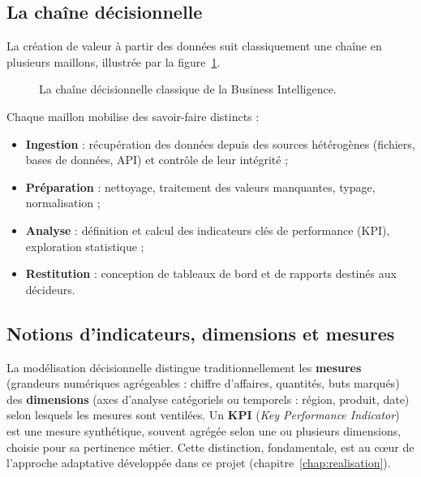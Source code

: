 \subsection{La chaîne décisionnelle}
La création de valeur à partir des données suit classiquement une chaîne en
plusieurs maillons, illustrée par la figure~\ref{fig:chaine}.

\begin{figure}[ht]
\centering
{}
\caption{La chaîne décisionnelle classique de la Business Intelligence.}
\label{fig:chaine}
\end{figure}

Chaque maillon mobilise des savoir-faire distincts :
\begin{itemize}
  \item \textbf{Ingestion} : récupération des données depuis des sources
        hétérogènes (fichiers, bases de données, API) et contrôle de leur
        intégrité ;
  \item \textbf{Préparation} : nettoyage, traitement des valeurs manquantes,
        typage, normalisation ;
  \item \textbf{Analyse} : définition et calcul des indicateurs clés de
        performance (KPI), exploration statistique ;
  \item \textbf{Restitution} : conception de tableaux de bord et de rapports
        destinés aux décideurs.
\end{itemize}

\subsection{Notions d'indicateurs, dimensions et mesures}
La modélisation décisionnelle distingue traditionnellement les
\textbf{mesures} (grandeurs numériques agrégeables : chiffre d'affaires,
quantités, buts marqués) des \textbf{dimensions} (axes d'analyse catégoriels
ou temporels : région, produit, date) selon lesquels les mesures sont
ventilées. Un \textbf{KPI} (\textit{Key Performance Indicator}) est une
mesure synthétique, souvent agrégée selon une ou plusieurs dimensions,
choisie pour sa pertinence métier. Cette distinction, fondamentale, est au
cœur de l'approche adaptative développée dans ce projet
(chapitre~\ref{chap:realisation}).

